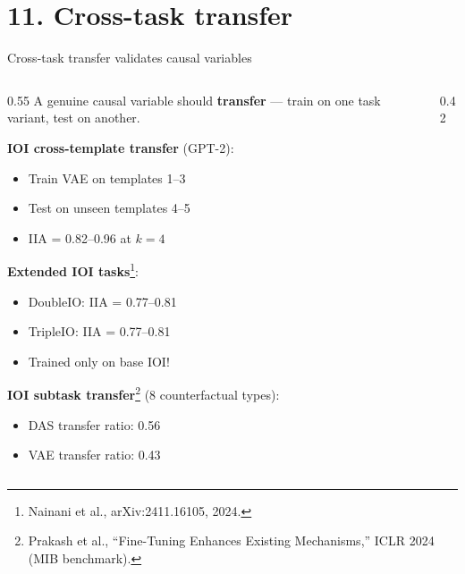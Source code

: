 \documentclass[aspectratio=169,11pt]{beamer}
\begin{document}
\section{11. Cross-task transfer}

\begin{frame}{Cross-task transfer validates causal variables}

\begin{columns}[T]
\begin{column}{0.55\textwidth}
{\small A genuine causal variable should \textbf{transfer} --- train on one task variant, test on another.}

\vspace{0.3em}
{\small \textbf{IOI cross-template transfer} (GPT-2):}
\begin{itemize}
  \item {\small Train VAE on templates 1--3}
  \item {\small Test on unseen templates 4--5}
  \item {\small IIA = 0.82--0.96 at $k = 4$}
\end{itemize}

\vspace{0.3em}
{\small \textbf{Extended IOI tasks}\footnote{\tiny Nainani et al., arXiv:2411.16105, 2024.}:}
\begin{itemize}
  \item {\small DoubleIO: IIA = 0.77--0.81}
  \item {\small TripleIO: IIA = 0.77--0.81}
  \item {\small Trained only on base IOI!}
\end{itemize}

\vspace{0.3em}
{\small \textbf{IOI subtask transfer}\footnote{\tiny Prakash et al., ``Fine-Tuning Enhances Existing Mechanisms,'' ICLR 2024 (MIB benchmark).} (8 counterfactual types):}
\begin{itemize}
  \item {\small DAS transfer ratio: 0.56}
  \item {\small VAE transfer ratio: 0.43}
\end{itemize}
\end{column}
\begin{column}{0.42\textwidth}
\end{column}
\end{columns}
\end{frame}
\end{document}
